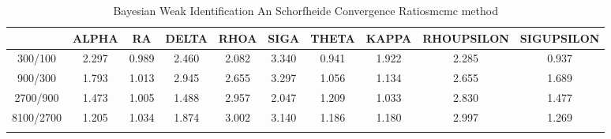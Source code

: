 \documentclass[a4paper,10pt]{article}
\begin{document}
\centering
\begin{longtable}{cccccccccc}
\toprule
 & ALPHA & RA & DELTA & RHOA & SIGA & THETA & KAPPA & RHOUPSILON & SIGUPSILON \\
\midrule
300/100 & 2.297 & 0.989 & 2.460 & 2.082 & 3.340 & 0.941 & 1.922 & 2.285 & 0.937 \\
900/300 & 1.793 & 1.013 & 2.945 & 2.655 & 3.297 & 1.056 & 1.134 & 2.655 & 1.689 \\
2700/900 & 1.473 & 1.005 & 1.488 & 2.957 & 2.047 & 1.209 & 1.033 & 2.830 & 1.477 \\
8100/2700 & 1.205 & 1.034 & 1.874 & 3.002 & 3.140 & 1.186 & 1.180 & 2.997 & 1.269 \\
\bottomrule
\caption{Bayesian Weak Identification An Schorfheide Convergence Ratiosmcmc method}
\label{table:tbl:WeakAnSchoConvergenceRatios_mcmc}
\end{longtable}
\end{document}
